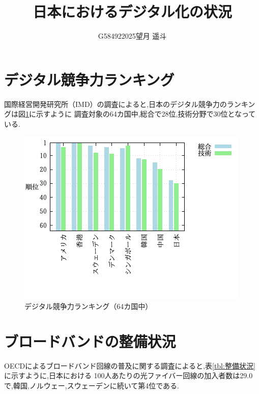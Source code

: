 \documentclass[a4paper,11pt,dvipdfmx]{ujarticle}
\title{日本におけるデジタル化の状況}
\author{G584922025望月 遥斗}
\begin{document}
\maketitle %

 \section{デジタル競争力ランキング}

 国際経営開発研究所（IMD）の調査\cite{imd}によると,日本のデジタル競争力のランキングは図\ref{fig:競争力}に示すように
 調査対象の64カ国中,総合で28位,技術分野で30位となっている.

 \begin{figure}[htbp]
    \centering
    \includegraphics[width=0.7\linewidth]{fig41.png}
    \caption{デジタル競争力ランキング（64カ国中）}\label{fig:競争力}
\end{figure}



\newpage
\section{ブロードバンドの整備状況}

OECDによるブロードバンド回線の普及に関する調査\cite{oecd}によると,表\ref{tbl:整備状況}に示すように,日本における 100人あたりの光ファイバー回線の加入者数は29.0で,韓国,ノルウェー,スウェーデンに続いて第4位である.
\end{document}

